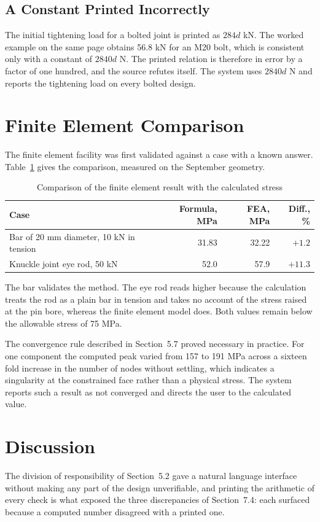 \subsection{A Constant Printed Incorrectly}
The initial tightening load for a bolted joint is printed as $284d$ kN. The worked example on the same page obtains 56.8 kN for an M20 bolt, which is consistent only with a constant of $2840d$ N. The printed relation is therefore in error by a factor of one hundred, and the source refutes itself. The system uses $2840d$ N and reports the tightening load on every bolted design.

\section{Finite Element Comparison}
The finite element facility was first validated against a case with a known answer. Table~\ref{tab:fe} gives the comparison, measured on the September geometry.

\begin{table}[htbp]
\centering
\caption{Comparison of the finite element result with the calculated stress}
\label{tab:fe}
\small
\begin{tabularx}{\textwidth}{@{}>{\raggedright\arraybackslash}Xrrr@{}}
\toprule
Case & Formula, MPa & FEA, MPa & Diff., \% \\
\midrule
Bar of 20 mm diameter, 10 kN in tension & 31.83 & 32.22 & $+1.2$ \\
Knuckle joint eye rod, 50 kN & 52.0 & 57.9 & $+11.3$ \\
\bottomrule
\end{tabularx}
\end{table}

The bar validates the method. The eye rod reads higher because the calculation treats the rod as a plain bar in tension and takes no account of the stress raised at the pin bore, whereas the finite element model does. Both values remain below the allowable stress of 75 MPa.

The convergence rule described in Section~5.7 proved necessary in practice. For one component the computed peak varied from 157 to 191 MPa across a sixteen fold increase in the number of nodes without settling, which indicates a singularity at the constrained face rather than a physical stress. The system reports such a result as not converged and directs the user to the calculated value.

\section{Discussion}
The division of responsibility of Section~5.2 gave a natural language interface without making any part of the design unverifiable, and printing the arithmetic of every check is what exposed the three discrepancies of Section~7.4: each surfaced because a computed number disagreed with a printed one.

